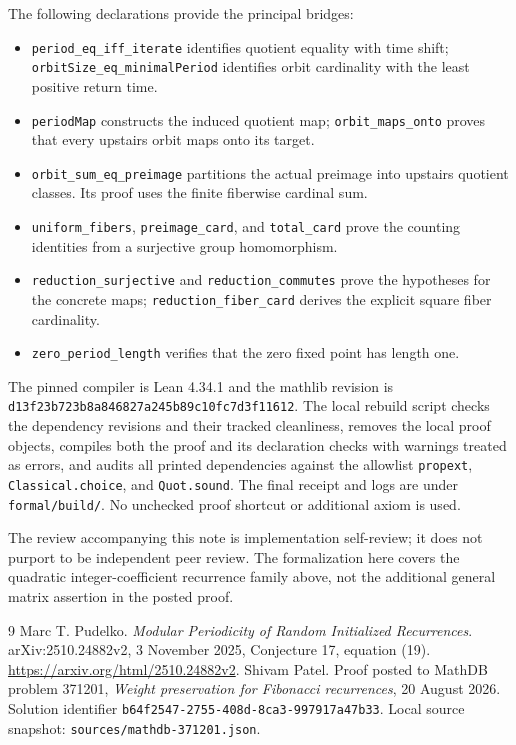\documentclass[11pt]{article}
\begin{document}
The following declarations provide the principal bridges:
\begin{itemize}
\item \texttt{period\_eq\_iff\_iterate} identifies quotient equality with time shift;
\texttt{orbitSize\_eq\_minimalPeriod} identifies orbit cardinality with the least
positive return time.
\item \texttt{periodMap} constructs the induced quotient map;
\texttt{orbit\_maps\_onto} proves that every upstairs orbit maps onto its target.
\item \texttt{orbit\_sum\_eq\_preimage} partitions the actual preimage into
upstairs quotient classes. Its proof uses the finite fiberwise cardinal sum.
\item \texttt{uniform\_fibers}, \texttt{preimage\_card}, and \texttt{total\_card}
prove the counting identities from a surjective group homomorphism.
\item \texttt{reduction\_surjective} and \texttt{reduction\_commutes} prove the
hypotheses for the concrete maps; \texttt{reduction\_fiber\_card} derives the
explicit square fiber cardinality.
\item \texttt{zero\_period\_length} verifies that the zero fixed point has
length one.
\end{itemize}

The pinned compiler is Lean 4.34.1 and the mathlib revision is
\texttt{d13f23b723b8a846827a245b89c10fc7d3f11612}.
The local rebuild script checks the dependency revisions and their tracked
cleanliness, removes the local proof objects, compiles both the proof and
its declaration checks with warnings treated as errors, and audits all
printed dependencies against the allowlist
\texttt{propext}, \texttt{Classical.choice}, and \texttt{Quot.sound}.
The final receipt and logs are under \texttt{formal/build/}.
No unchecked proof shortcut or additional axiom is used.

The review accompanying this note is implementation self-review;
it does not purport to be independent peer review. The formalization here
covers the quadratic integer-coefficient recurrence family above, not the
additional general matrix assertion in the posted proof.

\begin{thebibliography}{9}
Marc T. Pudelko.
\emph{Modular Periodicity of Random Initialized Recurrences}.
arXiv:2510.24882v2, 3 November 2025, Conjecture 17, equation (19).
\url{https://arxiv.org/html/2510.24882v2}.
Shivam Patel.
Proof posted to MathDB problem 371201, \emph{Weight preservation for Fibonacci
recurrences}, 20 August 2026.
Solution identifier \texttt{b64f2547-2755-408d-8ca3-997917a47b33}.
Local source snapshot: \texttt{sources/mathdb-371201.json}.
\end{thebibliography}
\end{document}
